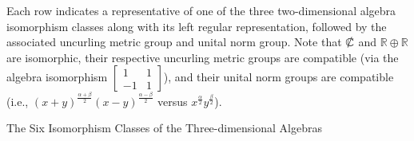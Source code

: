 \documentclass{amsart}
\numberwithin{equation}{section}
\theoremstyle{definition}
\numberwithin{theorem}{section}
\begin{document}
\vspace{.75cm}
 

 {\small Each row indicates a representative  of one of the three two-dimensional algebra isomorphism classes along with its left regular representation, followed by the associated uncurling metric group and unital norm group. Note that  $\slashed{\mathbb{C}}$ and $\mathbb{R}\oplus\mathbb{R}$ are isomorphic, their respective uncurling metric groups are compatible (via the algebra isomorphism $\left[\begin{array}{ccc}
 1 & 1   \\ 
 -1 & 1    
\end{array}\right]$), and their unital norm groups are  compatible (i.e., $(x+y)^{\frac{\alpha+\beta}{2}}(x-y)^{\frac{\alpha-\beta}{2}}$ versus $x^\frac{\alpha}{2} y^\frac{\beta}{2}$).  }


\newpage


  \hspace{1.5cm} The Six Isomorphism Classes of the Three-dimensional Algebras 

\vspace{1cm}
\end{document}
